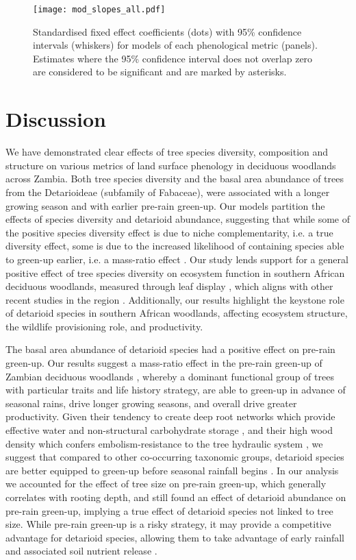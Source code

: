 \documentclass[11pt,a4paper]{article}
\begin{document}
\begin{figure}[H]
\centering
	\texttt{[image: mod\_slopes\_all.pdf]}
	\caption{Standardised fixed effect coefficients (dots) with 95\% confidence
		intervals (whiskers) for models of each phenological metric (panels). Estimates where the 95\% confidence interval does not overlap zero are
		considered to be significant and are marked by asterisks.}
	\label{mod_slopes}
\end{figure}

\section{Discussion}

We have demonstrated clear effects of tree species diversity, composition and
structure on various metrics of land surface phenology in deciduous woodlands
across Zambia. Both tree species diversity and the basal area abundance of
trees from the Detarioideae (subfamily of Fabaceae), were associated with a
longer growing season and with earlier pre-rain green-up. Our models partition the effects of species diversity and
detarioid abundance, suggesting that while some of the positive species
diversity effect is due to niche complementarity, i.e. a true diversity effect,
some is due to the increased likelihood of containing species able to green-up
earlier, i.e. a mass-ratio effect \citep{Grime1998, Tilman2014}. Our study
lends support for a general positive effect of tree species diversity on
ecosystem function in southern African deciduous woodlands, measured through
leaf display \citep{Richardson2009}, which aligns with other recent studies in
the region \citep{Godlee2021, McNicol2018, Shirima2015}. Additionally, our
results highlight the keystone role of detarioid species in southern African
woodlands, affecting ecosystem structure, the wildlife provisioning role, and
productivity.

The basal area abundance of detarioid species had a positive effect on pre-rain
green-up. Our results suggest a mass-ratio effect in the pre-rain green-up of
Zambian deciduous woodlands \citep{Grime1998}, whereby a dominant functional
group of trees with particular traits and life history strategy, are able to
green-up in advance of seasonal rains, drive longer growing seasons, and
overall drive greater productivity. Given their tendency to create deep root
networks which provide effective water and non-structural carbohydrate storage
\citep{Zhou2020, Timberlake1993}, and their high wood density which confers
embolism-resistance to the tree hydraulic system \citep{Hoffmann2011, Hacke2001, Chave2009}, we suggest
that compared to other co-occurring taxonomic groups, detarioid species are
better equipped to green-up before seasonal rainfall begins \citep{Vinya2018}.
In our analysis we accounted for the effect of tree size on pre-rain green-up,
which generally correlates with rooting depth, and still found an effect of
detarioid abundance on pre-rain green-up, implying a true effect of detarioid
species not linked to tree size. While pre-rain green-up is a risky strategy,
it may provide a competitive advantage for detarioid species, allowing them to
take advantage of early rainfall and associated soil nutrient release
\citep{February2016}.
\end{document}
